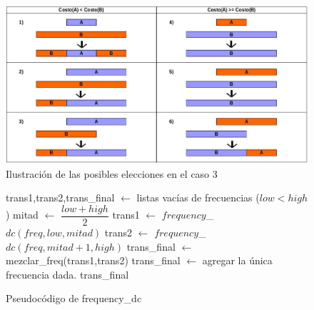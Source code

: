 \begin{figure}[htb]
  \begin{center}
      \includegraphics[scale=0.5]{imagenes/caso3.jpeg}
  \end{center}
  \caption{Ilustración de las posibles elecciones en el caso 3}\label{fig:caso3}
\end{figure}

\begin{figure}[!ht]
\begin{codebox}
\li trans1,trans2,trans_final $\leftarrow$ listas vacías de frecuencias
\li \If ($low < high$)
\li		\Then 
			mitad $\leftarrow$ $\dfrac{low + high}{2}$
\li			trans1 $\leftarrow$ $frequency$_$dc(freq,low,mitad)$
\li			trans2 $\leftarrow$ $frequency$_$dc(freq,mitad+1,high)$
\li			trans_final $\leftarrow$ {\sc mezclar_freq}(trans1,trans2)
\li 		\Else
			trans_final $\leftarrow$ agregar la única frecuencia dada.
		\End
\li \Return trans_final 
 \end{codebox}
\caption{Pseudocódigo de frequency_dc}\label{code:freq_dc}
\end{figure}

